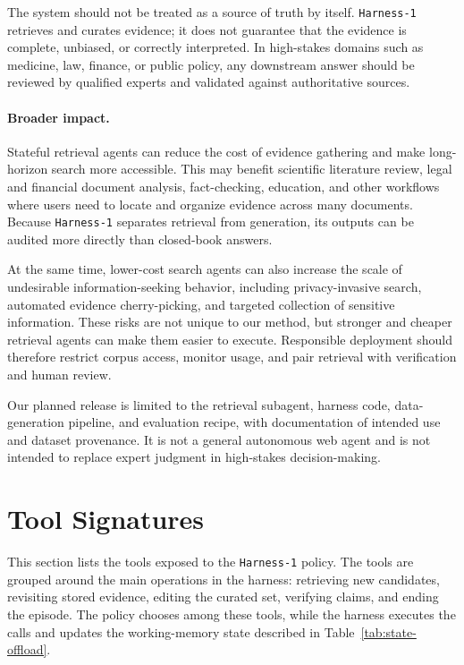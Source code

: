 \documentclass{article}
\newcommand{\sys}{\texttt{Harness-1}\xspace}
\begin{document}
The system should not be treated as a source of truth by itself. \sys retrieves
and curates evidence; it does not guarantee that the evidence is complete,
unbiased, or correctly interpreted. In high-stakes domains such as medicine,
law, finance, or public policy, any downstream answer should be reviewed by
qualified experts and validated against authoritative sources.

\paragraph{Broader impact.}
Stateful retrieval agents can reduce the cost of evidence gathering and make
long-horizon search more accessible. This may benefit scientific literature
review, legal and financial document analysis, fact-checking, education, and
other workflows where users need to locate and organize evidence across many
documents. Because \sys separates retrieval from generation, its outputs can be
audited more directly than closed-book answers.

At the same time, lower-cost search agents can also increase the scale of
undesirable information-seeking behavior, including privacy-invasive search,
automated evidence cherry-picking, and targeted collection of sensitive
information. These risks are not unique to our method, but stronger and cheaper
retrieval agents can make them easier to execute. Responsible deployment should
therefore restrict corpus access, monitor usage, and pair retrieval with
verification and human review.

Our planned release is limited to the retrieval subagent, harness code,
data-generation pipeline, and evaluation recipe, with documentation of intended
use and dataset provenance. It is not a general autonomous web agent and is not
intended to replace expert judgment in high-stakes decision-making.

\section{Tool Signatures}
\label{app:tools}

This section lists the tools exposed to the \sys policy. The tools are grouped
around the main operations in the harness: retrieving new candidates, revisiting
stored evidence, editing the curated set, verifying claims, and ending the
episode. The policy chooses among these tools, while the harness executes the
calls and updates the working-memory state described in
Table~\ref{tab:state-offload}.
\end{document}
